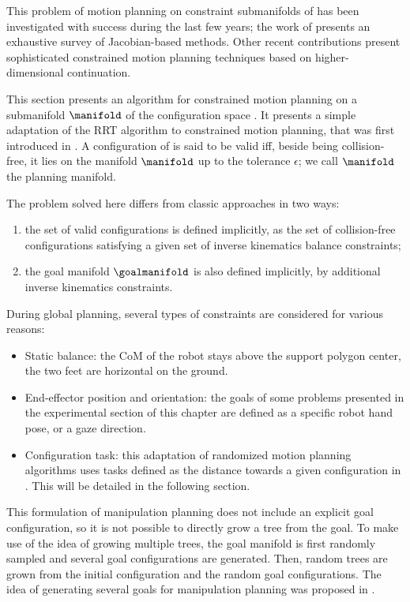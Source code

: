 This problem of motion planning on constraint submanifolds of
{\cspace} has been investigated with success during the last few
years; the work of \cite{berenson2011task} presents an exhaustive
survey of Jacobian-based methods. Other recent contributions
\cite{porta2012randomized} present sophisticated constrained motion
planning techniques based on higher-dimensional continuation.

This section presents an algorithm for constrained motion planning on
a submanifold $\manifold$ of the configuration space {\cspace}. It
presents a simple adaptation of the RRT algorithm to constrained
motion planning, that was first introduced in \cite{dalibard09}. A
configuration \config{} of {\cspace} is said to be valid iff, beside
being collision-free, it lies on the manifold $\manifold$ up to the
tolerance $\epsilon$; we call $\manifold$ the planning manifold.

The problem solved here differs from classic approaches in two ways:
\begin{enumerate}
\item the set of valid configurations is defined implicitly, as the
  set of collision-free configurations satisfying a given set of
  inverse kinematics balance constraints;
\item the goal manifold $\goalmanifold$ is also defined implicitly,
  by additional inverse kinematics constraints.
\end{enumerate}
During global planning, several types of constraints are considered
for various reasons:
\begin{itemize}
\item Static balance: the CoM of the robot stays above the support
  polygon center, the two feet are horizontal on the ground.
\item End-effector position and orientation: the goals of some
  problems presented in the experimental section of this chapter are
  defined as a specific robot hand pose, or a gaze direction.
\item Configuration task: this adaptation of randomized motion
  planning algorithms uses tasks defined as the distance towards a
  given configuration in {\cspace}. This will be detailed in the
  following section.
\end{itemize}

This formulation of manipulation planning does not include an explicit
goal configuration, so it is not possible to directly grow a tree from
the goal. To make use of the idea of growing multiple trees, the goal
manifold is first randomly sampled and several goal configurations are
generated. Then, random trees are grown from the initial configuration
and the random goal configurations. The idea of generating several
goals for manipulation planning was proposed in \cite{diankov2008bpc}.

